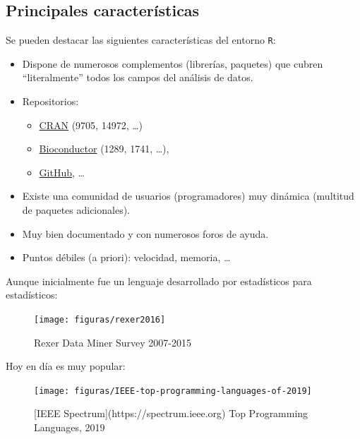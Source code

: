 \documentclass[
]{book}
\theoremstyle{break}
\begin{document}
\hypertarget{principales-caracteruxedsticas}{%
\subsection{Principales características}\label{principales-caracteruxedsticas}}

Se pueden destacar las siguientes características del entorno \texttt{R}:

\begin{itemize}
\item
  Dispone de numerosos complementos (librerías, paquetes) que cubren ``literalmente''
  todos los campos del análisis de datos.
\item
  Repositorios:

  \begin{itemize}
  \item
    \href{https://cran.r-project.org}{CRAN} (9705, 14972, \ldots)
  \item
    \href{https://www.bioconductor.org}{Bioconductor} (1289, 1741, \ldots),
  \item
    \href{https://github.com/trending/r?since=monthly}{GitHub}, \ldots{}
  \end{itemize}
\item
  Existe una comunidad de usuarios (programadores) muy dinámica
  (multitud de paquetes adicionales).
\item
  Muy bien documentado y con numerosos foros de ayuda.
\item
  Puntos débiles (a priori): velocidad, memoria, \ldots{}
\end{itemize}

Aunque inicialmente fue un lenguaje desarrollado por estadísticos
para estadísticos:

\begin{figure}[!htb]

{\centering \texttt{[image: figuras/rexer2016]} 

}

\caption{Rexer Data Miner Survey 2007-2015}\label{fig:rexer}
\end{figure}

Hoy en día es muy popular:

\begin{figure}[!htb]

{\centering \texttt{[image: figuras/IEEE-top-programming-languages-of-2019]} 

}

\caption{[IEEE Spectrum](https://spectrum.ieee.org) Top Programming Languages, 2019}\label{fig:ieee}
\end{figure}
\end{document}

